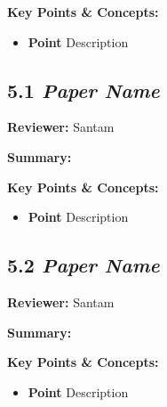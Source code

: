 \documentclass{article}
\begin{document}
\textbf{Key Points \& Concepts:}
\begin{itemize}
  \item \textbf{Point} Description
\end{itemize}

\subsection*{5.1 \textit{Paper Name}}

\hspace*{\parindent}\textbf{Reviewer:} Santam

\vspace{0.3cm}

\textbf{Summary:}

\vspace{0.3cm}

\textbf{Key Points \& Concepts:}
\begin{itemize}
  \item \textbf{Point} Description
\end{itemize}

\subsection*{5.2 \textit{Paper Name}}

\hspace*{\parindent}\textbf{Reviewer:} Santam

\vspace{0.3cm}

\textbf{Summary:}

\vspace{0.3cm}

\textbf{Key Points \& Concepts:}
\begin{itemize}
  \item \textbf{Point} Description
\end{itemize}
\end{document}

